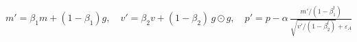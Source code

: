 \documentclass{article}
\begin{document}
\begin{preview}
$\displaystyle m' = \beta_1 m + (1-\beta_1) g,\quad v' = \beta_2 v + (1-\beta_2)\, g \odot g,\quad p' = p - \alpha\,\frac{m'/(1-\beta_1^t)}{\sqrt{v'/(1-\beta_2^t)} + \varepsilon_A}$
\end{preview}
\end{document}
